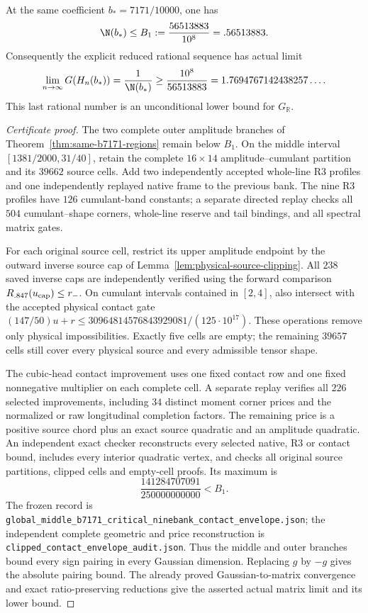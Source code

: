 \begin{theorem}
\label{thm:global-b7171-strengthened}
At the same coefficient $b_*=7171/10000$, one has
\[
 \N(b_*)\le B_1:=\frac{56513883}{10^8}=.56513883.
\]
Consequently the explicit reduced rational sequence has actual limit
\[
 \lim_{n\to\infty}G(H_n(b_*))
 =\frac1{\N(b_*)}
 \ge\frac{10^8}{56513883}
 =1.7694767142438257\ldots .
\]
This last rational number is an unconditional lower bound for
$G_{\mathbb R}$.
\end{theorem}
\begin{proof}[Certificate proof]
The two complete outer amplitude branches of
Theorem~\ref{thm:same-b7171-regions} remain below $B_1$.
On the middle interval $[1381/2000,31/40]$, retain the complete
$16\times14$ amplitude--cumulant partition and its $39662$ source
cells.  Add two independently accepted whole-line R3 profiles and
one independently replayed native frame to the previous bank.
The nine R3 profiles have $126$ cumulant-band constants; a separate
directed replay checks all $504$ cumulant--shape corners, whole-line
reserve and tail bindings, and all spectral matrix gates.

For each original source cell, restrict its upper amplitude endpoint
by the outward inverse source cap of
Lemma~\ref{lem:physical-source-clipping}.  All $238$ saved inverse
caps are independently verified using the forward comparison
$R_{.847}(u_{\rm cap})\le r_-$.  On cumulant intervals contained in
$[2,4]$, also intersect with the accepted physical contact gate
$(147/50)u+r\le30964814576843929081/(125\cdot10^{17})$.
These operations remove only physical impossibilities.  Exactly
five cells are empty; the remaining $39657$ cells still cover every
physical source and every admissible tensor shape.

The cubic-head contact improvement uses one fixed contact row and
one fixed nonnegative multiplier on each complete cell.  A separate
replay verifies all $226$ selected improvements, including $34$
distinct moment corner prices and the normalized or raw longitudinal
completion factors.  The remaining price is a positive source
chord plus an exact source quadratic and an amplitude quadratic.
An independent exact checker reconstructs every selected native,
R3 or contact bound, includes every interior quadratic vertex, and
checks all original source partitions, clipped cells and empty-cell
proofs.  Its maximum is
\[
 \frac{141284707091}{250000000000}<B_1.
\]
The frozen record is
\texttt{global\_\allowbreak middle\_\allowbreak b7171\_\allowbreak critical\_\allowbreak ninebank\_\allowbreak contact\_\allowbreak envelope.json};
the independent complete geometric and price reconstruction is
\texttt{clipped\_\allowbreak contact\_\allowbreak envelope\_\allowbreak audit.json}.
Thus the middle and outer branches bound every sign pairing in
every Gaussian dimension.  Replacing $g$ by $-g$ gives the absolute
pairing bound.  The already proved Gaussian-to-matrix convergence
and exact ratio-preserving reductions give the asserted actual
matrix limit and its lower bound.
\end{proof}
